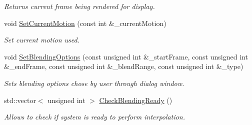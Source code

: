 \begin{DoxyCompactItemize}
\begin{DoxyCompactList}\small\item\em Returns current frame being rendered for display. \end{DoxyCompactList}\item 
void \hyperlink{class_n_g_l_scene_ab56d4a6117937cc106f657129ee8a304}{Set\+Current\+Motion} (const int \&\+\_\+current\+Motion)
\begin{DoxyCompactList}\small\item\em Set current motion used. \end{DoxyCompactList}\item 
void \hyperlink{class_n_g_l_scene_ad93102e6a6e90c8fde65651fdd9f7e41}{Set\+Blending\+Options} (const unsigned int \&\+\_\+start\+Frame, const unsigned int \&\+\_\+end\+Frame, const unsigned int \&\+\_\+blend\+Range, const unsigned int \&\+\_\+type)
\begin{DoxyCompactList}\small\item\em Sets blending options chose by user through dialog window. \end{DoxyCompactList}\item 
std\+::vector$<$ unsigned int $>$ \hyperlink{class_n_g_l_scene_a9cb8640625fed9acdb1981df14f6e700}{Check\+Blending\+Ready} ()\hypertarget{class_n_g_l_scene_a9cb8640625fed9acdb1981df14f6e700}{}\label{class_n_g_l_scene_a9cb8640625fed9acdb1981df14f6e700}

\begin{DoxyCompactList}\small\item\em Allows to check if system is ready to perform interpolation. \end{DoxyCompactList}\end{DoxyCompactItemize}
